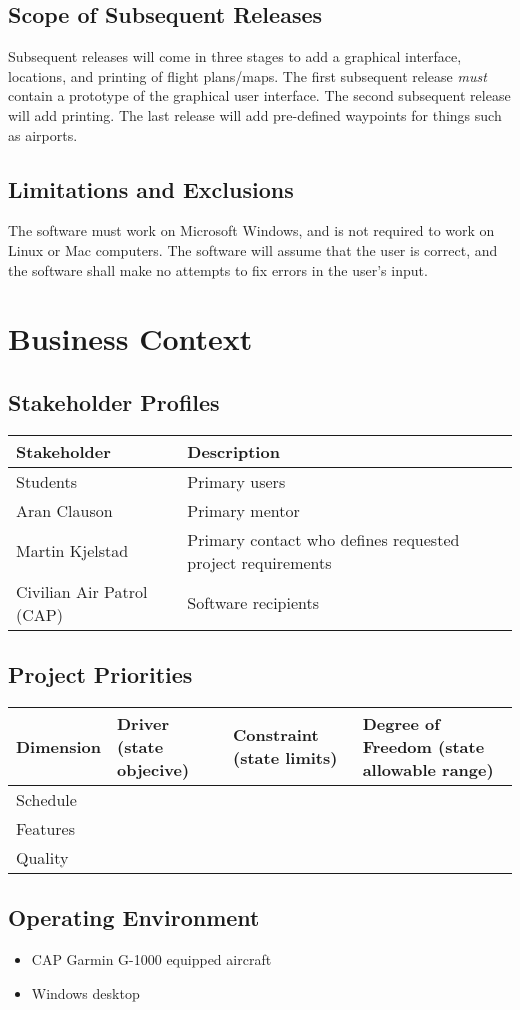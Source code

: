 \documentclass[12pt, letterpaper]{article}
\begin{document}
\subsection{Scope of Subsequent Releases}
Subsequent releases will come in three stages to add a graphical interface, locations, and printing of flight plans/maps.
The first subsequent release \emph{must} contain a prototype of the graphical user interface.
The second subsequent release will add printing.
The last release will add pre-defined waypoints for things such as airports.

\subsection{Limitations and Exclusions}
The software must work on Microsoft Windows, and is not required to work on Linux or Mac computers.
The software will assume that the user is correct,
    and the software shall make no attempts to fix errors in the user's input.

\section{Business Context}
\subsection{Stakeholder Profiles}

\begin{tabular}{ |l|l| }
\hline
Stakeholder & Description \\ \hline \hline
Students & Primary users \\ \hline
Aran Clauson & Primary mentor \\ \hline
Martin Kjelstad & Primary contact who defines requested project requirements \\ \hline
Civilian Air Patrol (CAP) & Software recipients \\ \hline
\hline
\end{tabular}

\subsection{Project Priorities}

\begin{tabular} { |l|l|l|l| }
\hline
Dimension & Driver \newline (state objecive) & Constraint \newline(state limits) & Degree of Freedom \newline(state allowable range) \\
\hline
\hline
Schedule & & & \\ \hline
Features & & & \\ \hline
Quality & & & \\
\hline
\end{tabular}

\subsection{Operating Environment}

\begin{itemize}
	\item CAP Garmin G-1000 equipped aircraft
	\item Windows desktop
\end{itemize}

{}

\end{document}
